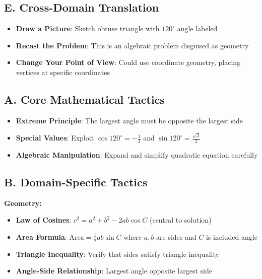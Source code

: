 \documentclass[12pt]{article}
\begin{document}
\begin{strategicbox}
\subsection*{E. Cross-Domain Translation}
\begin{itemize}[leftmargin=*]
    \item \textbf{Draw a Picture}: Sketch obtuse triangle with $120^\circ$ angle labeled
    \item \textbf{Recast the Problem}: This is an algebraic problem disguised as geometry
    \item \textbf{Change Your Point of View}: Could use coordinate geometry, placing vertices at specific coordinates
\end{itemize}
\end{strategicbox}

\begin{tacticalbox}
\subsection*{A. Core Mathematical Tactics}
\begin{itemize}[leftmargin=*]
    \item \textbf{Extreme Principle}: The largest angle must be opposite the largest side
    \item \textbf{Special Values}: Exploit $\cos 120^\circ = -\frac{1}{2}$ and $\sin 120^\circ = \frac{\sqrt{3}}{2}$
    \item \textbf{Algebraic Manipulation}: Expand and simplify quadratic equation carefully
\end{itemize}

\subsection*{B. Domain-Specific Tactics}

\textbf{Geometry:}
\begin{itemize}[leftmargin=*]
    \item \textbf{Law of Cosines}: $c^2 = a^2 + b^2 - 2ab\cos C$ (central to solution)
    \item \textbf{Area Formula}: $\text{Area} = \frac{1}{2}ab\sin C$ where $a, b$ are sides and $C$ is included angle
    \item \textbf{Triangle Inequality}: Verify that sides satisfy triangle inequality
    \item \textbf{Angle-Side Relationship}: Largest angle opposite largest side
\end{itemize}


\end{tacticalbox}
\end{document}

